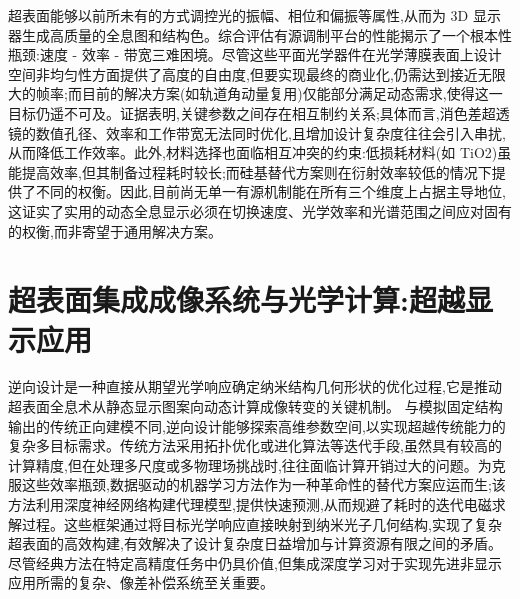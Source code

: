 超表面能够以前所未有的方式调控光的振幅、相位和偏振等属性,从而为 3D 显示器生成高质量的全息图和结构色。综合评估有源调制平台的性能揭示了一个根本性瓶颈:速度 - 效率 - 带宽三难困境。尽管这些平面光学器件在光学薄膜表面上设计空间非均匀性方面提供了高度的自由度,但要实现最终的商业化,仍需达到接近无限大的帧率;而目前的解决方案(如轨道角动量复用)仅能部分满足动态需求,使得这一目标仍遥不可及。证据表明,关键参数之间存在相互制约关系;具体而言,消色差超透镜的数值孔径、效率和工作带宽无法同时优化,且增加设计复杂度往往会引入串扰,从而降低工作效率。此外,材料选择也面临相互冲突的约束:低损耗材料(如 TiO2)虽能提高效率,但其制备过程耗时较长;而硅基替代方案则在衍射效率较低的情况下提供了不同的权衡。因此,目前尚无单一有源机制能在所有三个维度上占据主导地位,这证实了实用的动态全息显示必须在切换速度、光学效率和光谱范围之间应对固有的权衡,而非寄望于通用解决方案。\citep{doi_10_1515_nanoph_2025_0269_b999ce93} \citep{doi_10_1002_inf2_12116_b5c46838}

\section{超表面集成成像系统与光学计算:超越显示应用}\label{ux8d85ux8868ux9762ux96c6ux6210ux6210ux50cfux7cfbux7edfux4e0eux5149ux5b66ux8ba1ux7b97ux8d85ux8d8aux663eux793aux5e94ux7528}

逆向设计是一种直接从期望光学响应确定纳米结构几何形状的优化过程,它是推动超表面全息术从静态显示图案向动态计算成像转变的关键机制。\citep{doi_10_48550_arxiv_2506_21748_dc49c062} \citep{doi_10_1117_12_3099014_831c7349} 与模拟固定结构输出的传统正向建模不同,逆向设计能够探索高维参数空间,以实现超越传统能力的复杂多目标需求。传统方法采用拓扑优化或进化算法等迭代手段,虽然具有较高的计算精度,但在处理多尺度或多物理场挑战时,往往面临计算开销过大的问题。为克服这些效率瓶颈,数据驱动的机器学习方法作为一种革命性的替代方案应运而生;该方法利用深度神经网络构建代理模型,提供快速预测,从而规避了耗时的迭代电磁求解过程。这些框架通过将目标光学响应直接映射到纳米光子几何结构,实现了复杂超表面的高效构建,有效解决了设计复杂度日益增加与计算资源有限之间的矛盾。尽管经典方法在特定高精度任务中仍具价值,但集成深度学习对于实现先进非显示应用所需的复杂、像差补偿系统至关重要。\citep{doi_10_1088_1361_6439_ad3a72_72d60f33} \citep{doi_10_48550_arxiv_2204_00433_1c5cfd3e}

